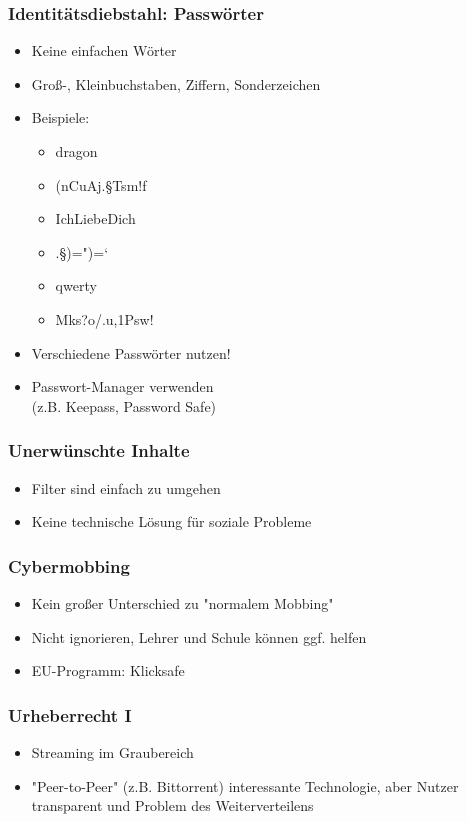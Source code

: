 \documentclass[12pt]{beamer}
\begin{document}
\begin{frame}
    \frametitle{Identitätsdiebstahl: Passwörter}
    \begin{itemize}
        \item<2-> Keine einfachen Wörter
        \item<3-> Groß-, Kleinbuchstaben, Ziffern, Sonderzeichen
        \item<4-> Beispiele:
            \begin{itemize}
                \item<5-> dragon
                \item<6-> (nCuAj.§Tsm!f
                \item<7-> IchLiebeDich
                \item<8-> .§)=")=`
                \item<10-> qwerty
                \item<11-> Mks?o/.u,1Psw!
            \end{itemize}
        \item<12-> Verschiedene Passwörter nutzen!
        \item<13-> Passwort-Manager verwenden \\ (z.B. Keepass, Password Safe)
    \end{itemize}
\end{frame}

\begin{frame}
  \frametitle{Unerwünschte Inhalte}
  \begin{itemize}
    \item<2-> Filter sind einfach zu umgehen
    \item<3-> Keine technische Lösung für soziale Probleme
  \end{itemize}
\end{frame}

\begin{frame}
  \frametitle{Cybermobbing}
  \begin{itemize}
    \item<2-> Kein großer Unterschied zu "normalem Mobbing"
    \item<3-> Nicht ignorieren, Lehrer und Schule können ggf. helfen
    \item<4-> EU-Programm: Klicksafe
  \end{itemize}
\end{frame}

\begin{frame}
  \frametitle{Urheberrecht I}
  \begin{itemize}
    \item<2-> Streaming im Graubereich
    \item<3-> "Peer-to-Peer" (z.B. Bittorrent) interessante Technologie, aber Nutzer transparent und Problem des Weiterverteilens
  \end{itemize}
\end{frame}
\end{document}
